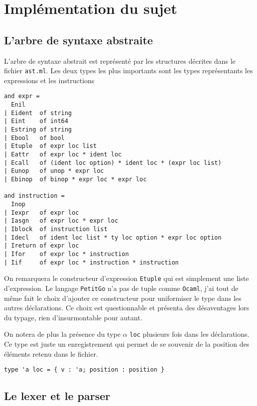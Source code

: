 \documentclass[11pt]{article}
\begin{document}
\section{Implémentation du sujet}

\subsection{L'arbre de syntaxe abstraite\label{sec:ast}}

L'arbre de syntaxe abstrait est représenté par les structures décrites dans le fichier \texttt{ast.ml}. Les deux types les plus importants sont les types représentants les expressions et les instructions

\begin{verbatim}
and expr =
  Enil
| Eident  of string
| Eint    of int64
| Estring of string
| Ebool   of bool
| Etuple  of expr loc list
| Eattr   of expr loc * ident loc
| Ecall   of (ident loc option) * ident loc * (expr loc list)
| Eunop   of unop * expr loc
| Ebinop  of binop * expr loc * expr loc

and instruction =
  Inop
| Iexpr   of expr loc
| Iasgn   of expr loc * expr loc
| Iblock  of instruction list
| Idecl   of ident loc list * ty loc option * expr loc option
| Ireturn of expr loc
| Ifor    of expr loc * instruction
| Iif     of expr loc * instruction * instruction
\end{verbatim}

On remarquera le constructeur d'expression \texttt{Etuple} qui est simplement une liste d'expression. Le langage \texttt{PetitGo} n'a pas de tuple comme \texttt{Ocaml}, j'ai tout de même fait le choix d'ajouter ce constructeur pour uniformiser le type dans les autres déclarations. Ce choix est questionnable et présenta des désaventages lors du typage, rien d'insurmontable pour autant.

On notera de plus la présence du type $\alpha$ \texttt{loc} plusieurs fois dans les déclarations. Ce type est juste un enregistrement qui permet de se souvenir de la position des éléments retenu dans le fichier.

\begin{verbatim}
type 'a loc = { v : 'a; position : position }
\end{verbatim}

\subsection{Le lexer et le parser}
\end{document}
